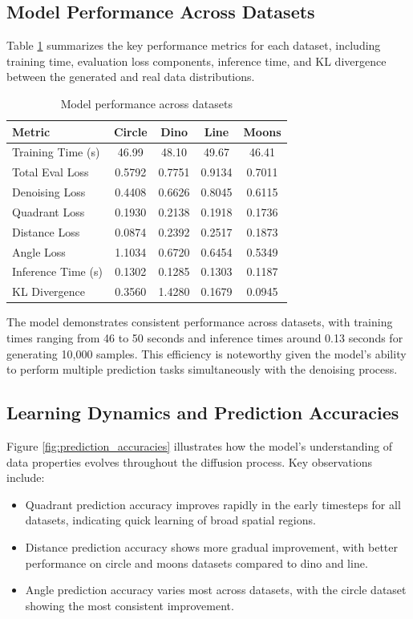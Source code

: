\documentclass{article} %
\begin{document}
\subsection{Model Performance Across Datasets}

Table \ref{tab:model_performance} summarizes the key performance metrics for each dataset, including training time, evaluation loss components, inference time, and KL divergence between the generated and real data distributions.

\begin{table}[h]
\centering
\caption{Model performance across datasets}
\label{tab:model_performance}
\begin{tabular}{lcccc}
\toprule
Metric & Circle & Dino & Line & Moons \\
\midrule
Training Time (s) & 46.99 & 48.10 & 49.67 & 46.41 \\
Total Eval Loss & 0.5792 & 0.7751 & 0.9134 & 0.7011 \\
Denoising Loss & 0.4408 & 0.6626 & 0.8045 & 0.6115 \\
Quadrant Loss & 0.1930 & 0.2138 & 0.1918 & 0.1736 \\
Distance Loss & 0.0874 & 0.2392 & 0.2517 & 0.1873 \\
Angle Loss & 1.1034 & 0.6720 & 0.6454 & 0.5349 \\
Inference Time (s) & 0.1302 & 0.1285 & 0.1303 & 0.1187 \\
KL Divergence & 0.3560 & 1.4280 & 0.1679 & 0.0945 \\
\bottomrule
\end{tabular}
\end{table}

The model demonstrates consistent performance across datasets, with training times ranging from 46 to 50 seconds and inference times around 0.13 seconds for generating 10,000 samples. This efficiency is noteworthy given the model's ability to perform multiple prediction tasks simultaneously with the denoising process.

\subsection{Learning Dynamics and Prediction Accuracies}

Figure \ref{fig:prediction_accuracies} illustrates how the model's understanding of data properties evolves throughout the diffusion process. Key observations include:

\begin{itemize}
    \item Quadrant prediction accuracy improves rapidly in the early timesteps for all datasets, indicating quick learning of broad spatial regions.
    \item Distance prediction accuracy shows more gradual improvement, with better performance on circle and moons datasets compared to dino and line.
    \item Angle prediction accuracy varies most across datasets, with the circle dataset showing the most consistent improvement.
\end{itemize}
\end{document}
